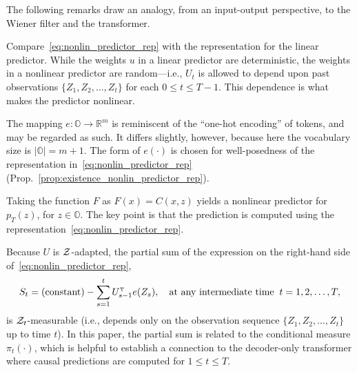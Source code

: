 \documentclass[twoside,11pt]{article}
\def\Re{\mathbb{R}}
\newcommand{\field}[1]{\mathbb{#1}}
\def\Re{\field{R}}
\def\transpose{{\hbox{\rm\tiny T}}}
\def\clZ{{\cal Z}}
\def\clZ{{\cal Z}}
\def\Re{\mathbb{R}}
\def\Prop#1{Prop.~\ref{#1}}
\def\clZ{{\cal Z}}
\renewcommand{\Re}{\mathbb{R}}
\def\clZ{{\cal Z}}
\def\bO{\mathbb{O}}
\begin{document}
The following remarks draw an analogy, from an input-output perspective, to the Wiener filter and the transformer.

\begin{remark}
  \label{remark:connection_to_transformer}
  Compare~\eqref{eq:nonlin_predictor_rep} with the representation for the linear predictor. While the weights $u$ in a linear predictor are deterministic, the weights in a nonlinear predictor are random---i.e., 
  $U_t$ is allowed to depend upon past observations $\{Z_1,Z_2,\hdots,Z_t\}$ for each $0\leq t\leq T-1$.
  This dependence is what makes the predictor nonlinear. 
\end{remark}


\begin{remark}
  The mapping $e:\bO\to \Re^m$ is reminiscent of the ``one-hot encoding'' of tokens, and may be regarded as such.  
  It differs slightly, however, because here the vocabulary size is $|\bO|=m+1$.
  The form of $e(\cdot)$ is chosen for well-posedness of the representation in~\eqref{eq:nonlin_predictor_rep}  (\Prop{prop:existence_nonlin_predictor_rep}).    
\end{remark}

\begin{remark}
  Taking the function $F$ as $F(x)=C(x,z)$ yields a nonlinear predictor for $p_T(z)$, for $z\in\bO$. 
  The key point is that the prediction is computed using the representation~\eqref{eq:nonlin_predictor_rep}.
\end{remark}

\begin{remark}
  Because $U$ is $\clZ$-adapted, the partial sum of the expression on the right-hand side of~\eqref{eq:nonlin_predictor_rep},
  \begin{equation*}
    S_t=\text{(constant)} - \sum_{s=1}^{t} U_{s-1}^\transpose e(Z_{s}),\quad \text{at any intermediate time} \;\; t=1,2,\hdots,T,
  \end{equation*}
  is $\clZ_t$-measurable (i.e., depends only on the observation sequence $\{Z_1,Z_2,\hdots,Z_t\}$ up to time $t$). 
  In this paper, the partial sum is related to the conditional measure
  $\pi_t(\cdot)$, which is helpful to establish a connection to the
  decoder-only transformer where causal predictions are computed for
  $1\leq t\leq T$. 
  \label{rem:intermediate_sum}
\end{remark}
\end{document}
